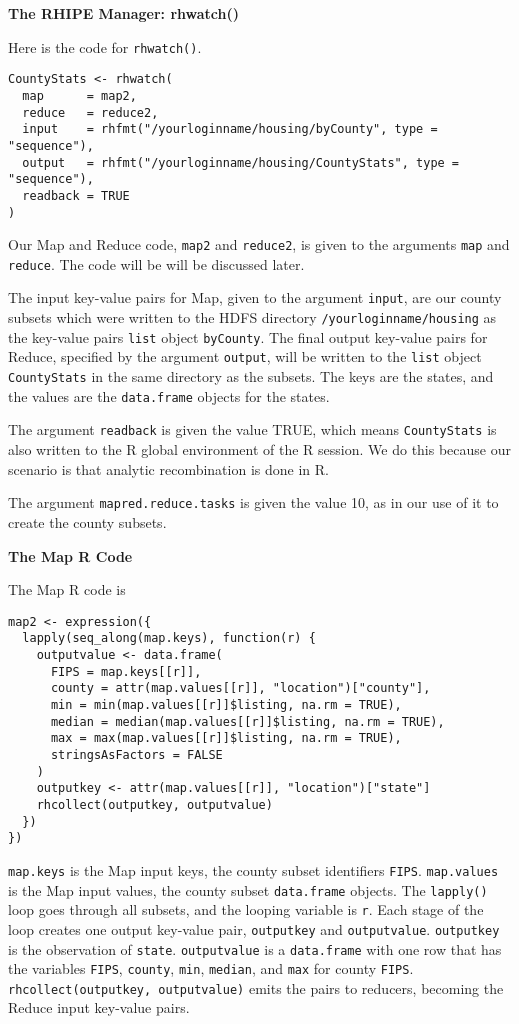 \textbf{The RHIPE Manager: rhwatch()}

Here is the code for \texttt{rhwatch()}.

\begin{verbatim}
CountyStats <- rhwatch(
  map      = map2,
  reduce   = reduce2,
  input    = rhfmt("/yourloginname/housing/byCounty", type = "sequence"),
  output   = rhfmt("/yourloginname/housing/CountyStats", type = "sequence"),
  readback = TRUE
)
\end{verbatim}

Our Map and Reduce code, \texttt{map2} and \texttt{reduce2}, is given to the arguments
\texttt{map} and \texttt{reduce}. The code will be will be discussed later.

The input key-value pairs for Map, given to the argument \texttt{input},
are our county subsets which were written to the HDFS directory
\texttt{/yourloginname/housing}  as the key-value pairs \texttt{list} object \texttt{byCounty}. 
The final output key-value pairs for Reduce, specified by the argument
\texttt{output}, will be written to the \texttt{list} object \texttt{CountyStats} in the same
directory as the subsets. The keys are the states, and the values are the
\texttt{data.frame} objects for the states.

The argument \texttt{readback} is given the value TRUE, which means \texttt{CountyStats} is
also written to the R global environment of the R session. We do this because
our scenario is that analytic recombination is done in R.

The argument \texttt{mapred.reduce.tasks} is given the value 10, as in our use of it
to create the county subsets.


\textbf{The Map R Code}

The Map R code is
\begin{verbatim}
map2 <- expression({
  lapply(seq_along(map.keys), function(r) {
    outputvalue <- data.frame(
      FIPS = map.keys[[r]],
      county = attr(map.values[[r]], "location")["county"],
      min = min(map.values[[r]]$listing, na.rm = TRUE),
      median = median(map.values[[r]]$listing, na.rm = TRUE),
      max = max(map.values[[r]]$listing, na.rm = TRUE),
      stringsAsFactors = FALSE
    )
    outputkey <- attr(map.values[[r]], "location")["state"]
    rhcollect(outputkey, outputvalue)
  })
})
\end{verbatim}

\texttt{map.keys} is the Map input keys, the county subset identifiers \texttt{FIPS}.
\texttt{map.values} is the Map input values, the county subset \texttt{data.frame}
objects. The \texttt{lapply()} loop goes through all subsets, and the looping
variable is \texttt{r}. Each stage of the loop creates one output key-value pair,
\texttt{outputkey} and \texttt{outputvalue}.
\texttt{outputkey} is the observation of \texttt{state}. \texttt{outputvalue} is a \texttt{data.frame}
with one row that has the variables \texttt{FIPS}, \texttt{county}, \texttt{min}, \texttt{median}, and
\texttt{max} for county \texttt{FIPS}. \texttt{rhcollect(outputkey, outputvalue)} emits the pairs
to reducers, becoming the Reduce input key-value pairs.

